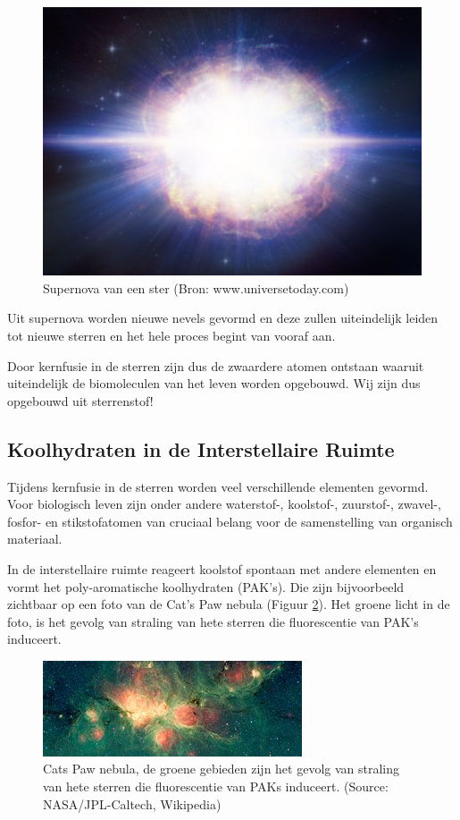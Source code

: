 \documentclass[
  11pt,
]{book}
\begin{document}
\begin{figure}

{\centering \includegraphics[width=0.5\linewidth]{./figs/hires} 

}

\caption{Supernova van een ster (Bron:  www.universetoday.com)}\label{fig:supernova}
\end{figure}

Uit supernova worden nieuwe nevels gevormd en deze zullen uiteindelijk leiden tot nieuwe sterren en het hele proces begint van vooraf aan.

Door kernfusie in de sterren zijn dus de zwaardere atomen ontstaan waaruit uiteindelijk de biomoleculen van het leven worden opgebouwd. Wij zijn dus opgebouwd uit sterrenstof!

\newpage

\hypertarget{koolhydraten-in-de-interstellaire-ruimte}{%
\subsection{Koolhydraten in de Interstellaire Ruimte}\label{koolhydraten-in-de-interstellaire-ruimte}}

Tijdens kernfusie in de sterren worden veel verschillende elementen gevormd. Voor biologisch leven zijn onder andere waterstof-, koolstof-, zuurstof-, zwavel-, fosfor- en stikstofatomen van cruciaal belang voor de samenstelling van organisch materiaal.

In de interstellaire ruimte reageert koolstof spontaan met andere elementen en vormt het poly-aromatische koolhydraten (PAK's). Die zijn bijvoorbeeld zichtbaar op een foto van de Cat's Paw nebula (Figuur \ref{fig:catPawNebula}). Het groene licht in de foto, is het gevolg van straling van hete sterren die fluorescentie van PAK's induceert.

\begin{figure}

{\centering \includegraphics[width=0.5\linewidth]{./figs/orionWithPAH} 

}

\caption{Cats Paw nebula, de groene gebieden zijn het gevolg van straling van hete sterren die fluorescentie van PAKs induceert. (Source: NASA/JPL-Caltech, Wikipedia)}\label{fig:catPawNebula}
\end{figure}
\end{document}
